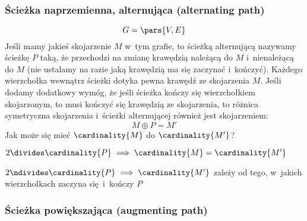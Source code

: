 \subsubsection*{Ścieżka naprzemienna, alternująca (alternating path)}
\begin{equation*}
    G = \pars{V, E}\\
\end{equation*}
Jeśli mamy jakieś skojarzenie \(M\) w~tym grafie, to ścieżką alternującą nazywamy ścieżkę \(P\) taką, że przechodzi na zmianę krawędzią należącą do \(M\) i~nienależącą do \(M\) (nie ustalamy na razie jaką krawędzią ma się zaczynać i~kończyć). Każdego wierzchołka wewnątrz ścieżki dotyka pewna krawędź ze skojarzenia \(M\). Jeśli dodamy dodatkowy wymóg, że jeśli ścieżka kończy się wierzchołkiem skojarzonym, to musi kończyć się krawędzią ze skojarzenia, to różnica symetryczna skojarzenia i~ścieżki alternującej również jest skojarzeniem:
\begin{equation*}
    M \oplus P = M'
\end{equation*}
Jak może się mieć \(\cardinality{M}\) do \(\cardinality{M'}\)?
\begin{proofcases}
    \item \(2 \divides \cardinality{P} \implies \cardinality{M} = \cardinality{M'}\)
    \item \(2 \ndivides \cardinality{P} \implies \cardinality{M'}\) zależy od tego, w~jakich wierzchołkach zaczyna się i~kończy \(P\)
\end{proofcases}
\subsubsection*{Ścieżka powiększająca (augmenting path)}
